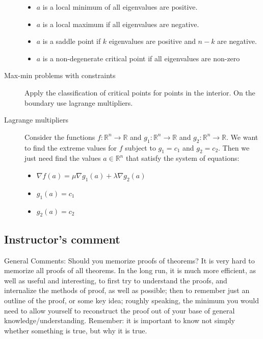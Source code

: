 \begin{description}
	\begin{itemize}
		\item $a$ is a local minimum of all eigenvalues are positive.
		\item $a$ is a local maximum if all eigenvalues are negative.
		\item $a$ is a saddle point if $k$ eigenvalues are positive and $n-k$ are negative.
		\item $a$ is a non-degenerate critical point if all eigenvalues are non-zero
	\end{itemize}
\item[Max-min problems with constraints]
Apply the classification of critical points for points in the interior. On the boundary use lagrange multipliers.
\item[Lagrange multipliers]
Consider the functions $f: \mathbb{R}^n \to \mathbb{R}$ and $g_1: \mathbb{R}^n \to \mathbb{R}$ and $g_2: \mathbb{R}^n \to \mathbb{R}$. We want to find the extreme values for $f$ subject to $g_1 = c_1$ and $g_2 = c_2$. Then we just need find the values $a \in \mathbb{R}^n$ that satisfy the system of equations:
	\begin{itemize}
		\item $\nabla f(a) = \mu \nabla g_1(a) + \lambda \nabla g_2(a)$
		\item $g_1(a) = c_1$
		\item $g_2(a) = c_2$
	\end{itemize}
\end{description}



\subsection{Instructor's comment}
General Comments: Should you memorize proofs of theorems? It is very hard to
memorize all proofs of all theorems. In the long run, it is much more efficient, as well
as useful and interesting, to first try to understand the proofs, and internalize the
methods of proof, as well as possible; then to remember just an outline of the proof,
or some key idea; roughly speaking, the minimum you would need to allow yourself
to reconstruct the proof out of your base of general knowledge/understanding.
Remember: it is important to know not simply whether something is true, but why
it is true.



